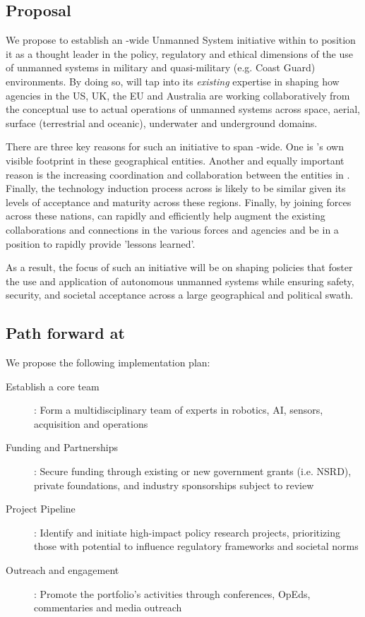 \documentclass[10pt,letterpaper]{article}
\begin{document}
\subsection{Proposal}

We propose to establish an \auke-wide Unmanned System initiative
within \org to position it as a thought leader in the policy,
regulatory and ethical dimensions of the use of unmanned systems in
military and quasi-military (e.g. Coast Guard) environments. By doing
so, \org will tap into its \emph{existing} expertise in shaping how
agencies in the US, UK, the EU and Australia are working
collaboratively from the conceptual use to actual operations of
unmanned systems across space, aerial, surface (terrestrial and
oceanic), underwater and underground domains.

There are three key reasons for such an initiative to span \auke-wide.
One is \orge's own visible footprint in these geographical
entities. Another and equally important reason is the increasing
coordination and collaboration between the entities in \auke. Finally,
the technology induction process across \auk is likely to be similar
given its levels of acceptance and maturity across these
regions. Finally, by joining forces across these nations, \org can
rapidly and efficiently help augment the existing collaborations and
connections in the various forces and agencies and be in a position to
rapidly provide 'lessons learned'.

As a result, the focus of such an initiative will be on shaping
policies that foster the use and application of autonomous unmanned
systems while ensuring safety, security, and societal acceptance
across a large geographical and political swath.


\subsection{Path forward at \org}

We propose the following implementation plan:

\begin{description}

\item[Establish a core team]: Form a multidisciplinary team of \org
  experts in robotics, AI, sensors, acquisition and operations

\item[Funding and Partnerships]: Secure funding through existing or
  new government grants (i.e. NSRD), private foundations, and industry
  sponsorships subject to review

\item[Project Pipeline]: Identify and initiate high-impact policy
  research projects, prioritizing those with potential to influence
  regulatory frameworks and societal norms
  
\item[Outreach and engagement]: Promote the portfolio’s activities
  through conferences, OpEds, commentaries and media outreach


\end{description}
\end{document}
